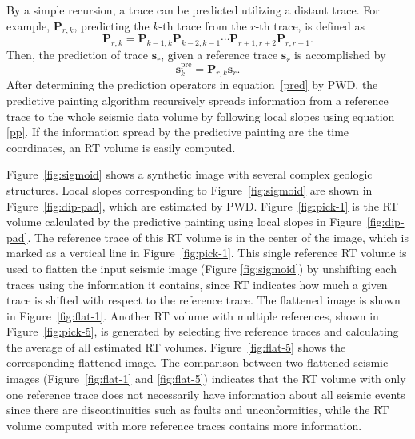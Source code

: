     By a simple recursion, a trace can be predicted utilizing a distant trace. 
    For example, $\mathbf{P}_{r,k}$, predicting the $k$-th trace from the $r$-th 
    trace, is defined as
    \begin{equation}
        \label{predict}
        \mathbf{P}_{r,k}=\mathbf{P}_{k-1,k}\mathbf{P}_{k-2,k-1}\cdots
        \mathbf{P}_{r+1,r+2}\mathbf{P}_{r,r+1}.
    \end{equation}
    Then, the prediction of trace $\mathbf{s}_r$, given a reference trace
    $\mathbf{s}_r$ is accomplished by
    \begin{equation}
        \label{pp}
        \mathbf{s}_k^{\text{pre}}=\mathbf{P}_{r,k}\mathbf{s}_r.
    \end{equation}
    After determining the prediction operators in equation~\ref{pred} by PWD, 
    the predictive painting algorithm recursively spreads information from a 
    reference trace to the whole seismic data volume by following local slopes
    using equation \ref{pp}. 
    If the information spread by the predictive painting are the time 
    coordinates, an RT volume is easily computed.

    Figure~\ref{fig:sigmoid} shows a synthetic image with several complex 
    geologic structures. 
    Local slopes corresponding to Figure~\ref{fig:sigmoid} are shown in 
    Figure~\ref{fig:dip-pad}, which are estimated by PWD. 
    Figure~\ref{fig:pick-1} is the RT volume calculated by the predictive 
    painting using local slopes in Figure~\ref{fig:dip-pad}. 
    The reference trace of this RT volume is in the center of the image, which 
    is marked as a vertical line in Figure~\ref{fig:pick-1}. 
    This single reference RT volume is used to flatten the input seismic 
    image (Figure \ref{fig:sigmoid}) by unshifting each traces using the 
    information it contains, since RT indicates how much a given trace is 
    shifted with respect to the reference trace.
    The flattened image is shown in Figure~\ref{fig:flat-1}.
    Another RT volume with multiple references, shown in 
    Figure~\ref{fig:pick-5}, is generated by selecting five reference traces and 
    calculating the average of all estimated RT volumes.
    Figure~\ref{fig:flat-5} shows the corresponding flattened image.
    The comparison between two flattened seismic images (Figure~\ref{fig:flat-1} 
    and \ref{fig:flat-5}) indicates that the RT volume with only one reference 
    trace does not necessarily have information about all seismic events since 
    there are discontinuities such as faults and unconformities, while the RT 
    volume computed with more reference traces contains more information.

